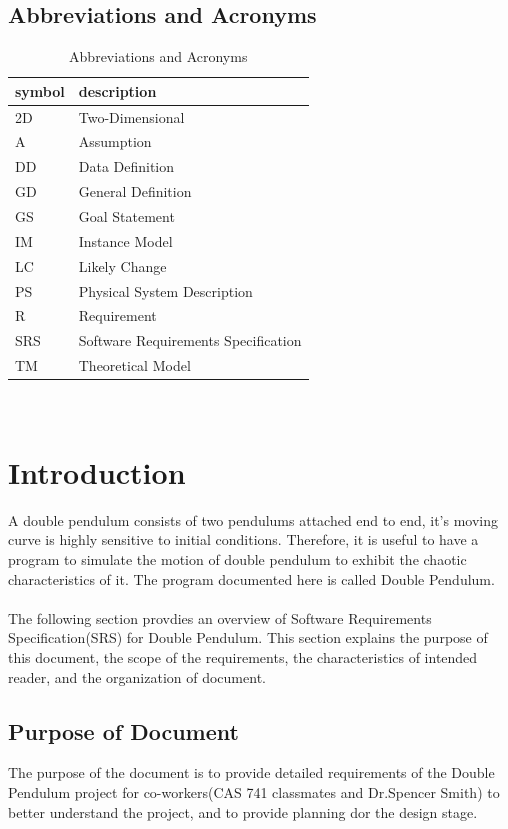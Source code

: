 \documentclass[12pt]{article}
\begin{document}
\subsection{Abbreviations and Acronyms}\label{sec_abbandacr}
\renewcommand{\arraystretch}{1.2}
\begin{table}[H]
  \centering
  \begin{tabular}{l l} 
    \toprule    
    \textbf{symbol} & \textbf{description}\\
    \midrule 
    2D & Two-Dimensional\\
    A & Assumption\\
    DD & Data Definition\\
    GD & General Definition\\
    GS & Goal Statement\\
    IM & Instance Model\\
    LC & Likely Change\\
    PS & Physical System Description\\
    R & Requirement\\
    SRS & Software Requirements Specification\\
    TM & Theoretical Model\\
    \bottomrule
  \end{tabular}\\
  \caption{Abbreviations and Acronyms}
\end{table}

\newpage
\section{Introduction}\label{sec_intro}
A double pendulum consists of two pendulums attached end to end, it's moving curve is highly sensitive to initial conditions. Therefore, it is useful to have a program to simulate the motion of double pendulum to exhibit the chaotic characteristics of it. The program documented here is called Double Pendulum.\\\\The following section provdies an overview of Software Requirements Specification(SRS) for Double Pendulum. This section explains the purpose of this document, the scope of the requirements, the characteristics of intended reader, and the organization of document. 

\subsection{Purpose of Document}\label{sec_purpose}
The purpose of the document is to provide detailed requirements of the Double Pendulum project for co-workers(CAS 741 classmates and Dr.Spencer Smith) to better understand the project, and to provide planning dor the design stage. 
\end{document}
